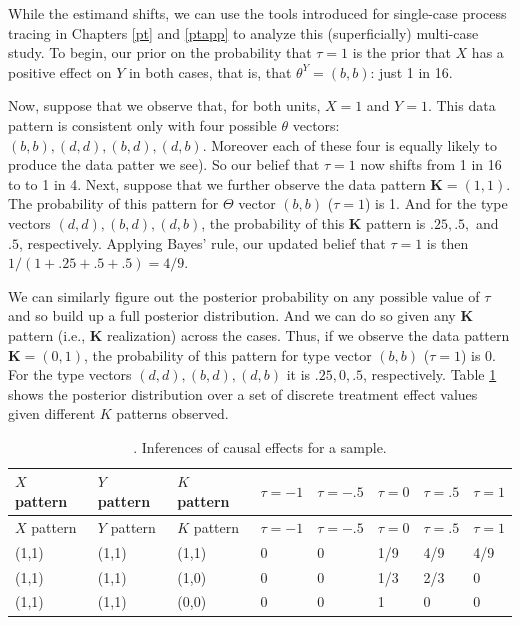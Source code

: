\documentclass[
  12pt,
]{book}
\begin{document}
While the estimand shifts, we can use the tools introduced for single-case process tracing in Chapters \ref{pt} and \ref{ptapp} to analyze this (superficially) multi-case study. To begin, our prior on the probability that \(\tau=1\) is the prior that \(X\) has a positive effect on \(Y\) in both cases, that is, that \(\theta^Y = (b,b)\): just 1 in 16.

Now, suppose that we observe that, for both units, \(X=1\) and \(Y=1\). This data pattern is consistent only with four possible \(\theta\) vectors: \((b,b), (d,d), (b, d), (d,b)\). Moreover each of these four is equally likely to produce the data patter we see). So our belief that \(\tau=1\) now shifts from 1 in 16 to to 1 in 4. Next, suppose that we further observe the data pattern \(\mathbf K = (1,1)\). The probability of this pattern for \(\Theta\) vector \((b,b)\) (\(\tau = 1\)) is 1. And for the type vectors \((d,d), (b, d), (d,b)\), the probability of this \(\mathbf K\) pattern is \(.25, .5,\) and \(.5\), respectively. Applying Bayes' rule, our updated belief that \(\tau = 1\) is then \(1/(1 + .25 + .5 + .5) = 4/9\).

We can similarly figure out the posterior probability on any possible value of \(\tau\) and so build up a full posterior distribution. And we can do so given any \(\mathbf K\) pattern (i.e., \(\mathbf K\) realization) across the cases. Thus, if we observe the data pattern \(\mathbf K = (0,1)\), the probability of this pattern for type vector \((b,b)\) (\(\tau = 1\)) is 0. For the type vectors \((d,d), (b, d), (d,b)\) it is \(.25, 0, .5\), respectively. Table \ref{tab:ch9patterns} shows the posterior distribution over a set of discrete treatment effect values given different \(K\) patterns observed.

\begin{longtable}[]{@{}llllllll@{}}
\caption{\label{tab:ch9patterns}. Inferences of causal effects for a sample.}\tabularnewline
\toprule
\(X\) pattern & \(Y\) pattern & \(K\) pattern & \(\tau = -1\) & \(\tau = -.5\) & \(\tau = 0\) & \(\tau = .5\) & \(\tau = 1\) \\
\midrule
\endfirsthead
\toprule
\(X\) pattern & \(Y\) pattern & \(K\) pattern & \(\tau = -1\) & \(\tau = -.5\) & \(\tau = 0\) & \(\tau = .5\) & \(\tau = 1\) \\
\midrule
\endhead
(1,1) & (1,1) & (1,1) & 0 & 0 & 1/9 & 4/9 & 4/9 \\
(1,1) & (1,1) & (1,0) & 0 & 0 & 1/3 & 2/3 & 0 \\
(1,1) & (1,1) & (0,0) & 0 & 0 & 1 & 0 & 0 \\
\bottomrule
\end{longtable}
\end{document}
